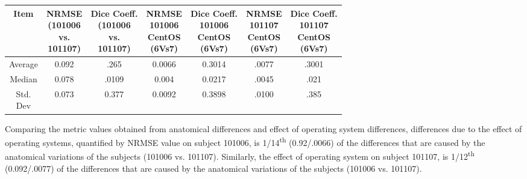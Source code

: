 \begin{center}
\begin{tabularx}{.98\textwidth}{|c|c|c|c|c|c|c|}
\hline
Item  & \makecell[l]{NRMSE\\(101006 \\ vs.\\101107)} & \makecell[l]{Dice Coeff.\\(101006\\ vs.\\101107)} & \makecell[l]{NRMSE\\101006\\CentOS\\(6Vs7)} & \makecell[l]{Dice Coeff.\\ 101006\\CentOS\\(6Vs7)} & \makecell[l]{NRMSE\\101107\\CentOS\\(6Vs7)} & \makecell[l]{Dice Coeff.\\ 101107\\CentOS\\(6Vs7)} \\ \hline
Average            & 0.092        & .265      & 0.0066     & 0.3014   & .0077   & .3001     \\ \hline
Median             & 0.078    & .0109       & 0.004          & 0.0217           & .0045     & .021  \\ \hline
\makecell[l]{Std.\\Dev} & 0.073     & 0.377           & 0.0092         & 0.3898   & .0100       & .385 \\ \hline
\end{tabularx}
\label{tab:comparison_table}
\end{center}

Comparing the metric values obtained from anatomical differences and effect of operating system differences, differences due to the effect of operating systems, quantified by NRMSE value on subject 101006, is 1/14\textsuperscript{th} (0.92/.0066) of the differences that are caused by the anatomical variations of the subjects (101006 vs. 101107). Similarly, the effect of operating system on subject 101107, is 1/12\textsuperscript{th} (0.092/.0077) of the differences that are caused by the anatomical variations of the subjects (101006 vs. 101107).
